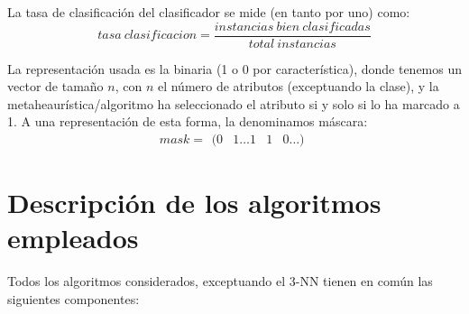 \documentclass[a4paper,11pt]{article}
\begin{document}
La tasa de clasificación del clasificador se mide (en tanto por uno) como: $$tasa\: clasificacion = \frac{instancias\: 
bien\: clasificadas}{total\: instancias}$$

La representación usada es la binaria (1 o 0 por característica), donde tenemos un vector de tamaño $n$, con $n$ el número 
de atributos (exceptuando la clase), y la metaheaurística/algoritmo ha seleccionado el atributo si y solo si lo ha marcado 
a 1. A una representación de esta forma, la denominamos máscara: $$ mask =\begin{matrix} (0 & 1\ldots 1 & 1 & 0\ldots) 
\end{matrix}$$


\section{Descripción de los algoritmos empleados}
Todos los algoritmos considerados, exceptuando el 3-NN tienen en común las siguientes componentes:
\begin{itemize} 
 
\end{itemize}
\end{document}
